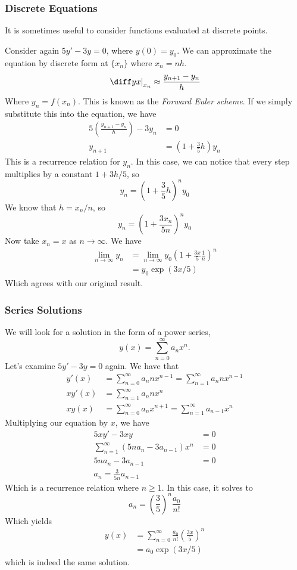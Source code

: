 \documentclass[12pt]{article}
\begin{document}
\subsubsection*{Discrete Equations}

It is sometimes useful to consider functions
evaluated at discrete points.

Consider again $5y' - 3y = 0$, where $y(0) = y_{0}$.
We can approximate the equation by discrete form at $\{x_n\}$
where $x_n = nh$.
\[
    \diffc yx{x_n} \approx \frac{y_{n+1}-y_n}{h}
\]
Where $y_n = f(x_n)$. This is known as the \emph{Forward Euler scheme}.
If we simply substitute this into the equation, we have
\begin{align*}
    5\left(\frac{y_{n+1}-y_n}{h}\right) - 3y_n &= 0\\
    y_{n+1} &= \left(1 + \frac{3}{5} h\right)y_n
\end{align*}
This is a recurrence relation for $y_n$.
In this case, we can notice that every step multiplies
by a constant $1 + 3h/5$, so
\[
y_n = \left(1 + \frac{3}{5}h\right)^{n} y_0
\]
We know that $h = x_n/n$, so
\[
y_n = \left(1 + \frac{3x_n}{5n}\right)^{n} y_0
\]
Now take $x_n = x$ as $n \to \infty$. We have
\begin{align*}
\lim_{n\to\infty} y_n 
&= \lim_{n\to\infty} y_{0}\left(1+ \frac{3x}{5} \frac{1}{n}\right)^{n}\\
&= y_{0}\exp(3x/5)
\end{align*}
Which agrees with our original result.

\subsubsection*{Series Solutions}

We will look for a solution in the form of a power series,
\[
y(x) = \sum_{n=0}^{\infty} a_n x^{n}.
\]
Let's examine $5y' - 3y = 0$ again. We have that
\begin{align*}
    y'(x) &= \sum_{n=0}^{\infty}a_n n x^{n-1} = \sum_{n=1}^{\infty}a_n n x^{n-1}\\
    xy'(x) &= \sum_{n=1}^{\infty} a_n n x^{n}\\
    xy(x) &= \sum_{n=0}^{\infty} a_n x^{n+1} = \sum_{n=1}^{\infty} a_{n-1} x^{n}
\end{align*}
Multiplying our equation by $x$, we have
\begin{align*}
    5xy' - 3xy &= 0\\
    \sum_{n=1}^{\infty}(5na_n - 3a_{n-1})x^{n}&=0\\
    5na_n - 3a_{n-1} &= 0\\
    a_n = \frac{3}{5n}a_{n-1}
\end{align*}
Which is a recurrence relation where $n\ge1$.
In this case, it solves to
\[
a_n = \left(\frac{3}{5}\right)^{n} \frac{a_0}{n!}
\]
Which yields
\begin{align*}
    y(x) 
    &= \sum_{n=0}^{\infty} \frac{a_0}{n!} \left(\frac{3x}{5}\right)^{n}\\
    &= a_0 \exp(3x/5)
\end{align*}
which is indeed the same solution.
\end{document}
